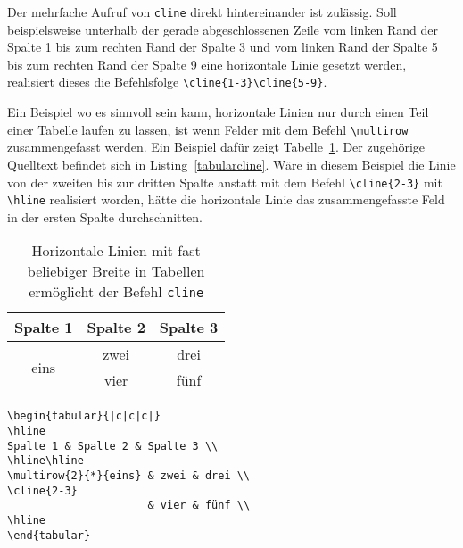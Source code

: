 Der mehrfache Aufruf von \verb!cline! direkt hintereinander ist zulässig. 
Soll beispielsweise unterhalb der gerade abgeschlossenen Zeile vom linken 
Rand der Spalte 1 bis zum rechten Rand der Spalte 3 und vom linken 
Rand der Spalte 5 bis zum rechten Rand der Spalte 9 eine 
horizontale Linie gesetzt werden, realisiert dieses die Befehlsfolge 
\verb!\cline{1-3}\cline{5-9}!.



Ein Beispiel wo es sinnvoll sein kann, horizontale Linien nur durch einen Teil einer Tabelle laufen zu lassen, ist wenn Felder mit dem Befehl 
\verb!\multirow! 
zusammengefasst werden. Ein Beispiel dafür zeigt Tabelle~\ref{Tabelle_Multirow2}. Der zugehörige Quelltext befindet sich in Listing~\ref{tabularcline}. Wäre in diesem Beispiel die Linie von der zweiten bis zur dritten Spalte anstatt mit dem Befehl \verb|\cline{2-3}| mit \verb|\hline| realisiert worden, hätte die horizontale Linie das zusammengefasste Feld in der ersten Spalte durchschnitten.







\begin{table}[h!tb]
\centering
\caption{Horizontale Linien mit fast beliebiger Breite in Tabellen ermöglicht der Befehl \texttt{cline}}
\label{Tabelle_Multirow2}
\begin{tabular}{|c|c|c|}
\hline
Spalte 1 & Spalte 2 & Spalte 3 \\
\hline\hline
\multirow{2}{*}{eins} & zwei & drei \\
\cline{2-3}
                      & vier & fünf \\
\hline
\end{tabular}
\end{table}

\begin{lstlisting}[caption={Horizontale Linien mit fast beliebiger Breite in Tabellen setzen},label=tabularcline, style=customlatex]
\begin{tabular}{|c|c|c|}
\hline
Spalte 1 & Spalte 2 & Spalte 3 \\
\hline\hline
\multirow{2}{*}{eins} & zwei & drei \\
\cline{2-3}
                      & vier & fünf \\
\hline
\end{tabular}
\end{lstlisting}
